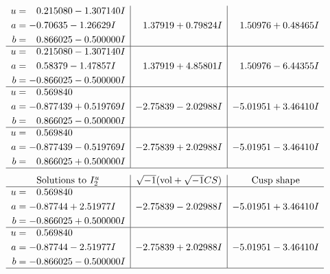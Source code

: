 \documentclass[1p]{elsarticle_modified}
\theoremstyle{definition}
\newcommand{\I}{\sqrt{-1}}
\begin{document}
$$\begin{array}{c|c|c}
\begin{aligned}
u &= \phantom{-}0.215080 - 1.307140 I \\
a &= -0.70635 - 1.26629 I \\
b &= \phantom{-}0.866025 - 0.500000 I\end{aligned}
 & \phantom{-}1.37919 + 0.79824 I & \phantom{-}1.50976 + 0.48465 I \\ \hline\begin{aligned}
u &= \phantom{-}0.215080 - 1.307140 I \\
a &= \phantom{-}0.58379 - 1.47857 I \\
b &= -0.866025 - 0.500000 I\end{aligned}
 & \phantom{-}1.37919 + 4.85801 I & \phantom{-}1.50976 - 6.44355 I \\ \hline\begin{aligned}
u &= \phantom{-}0.569840\phantom{ +0.000000I} \\
a &= -0.877439 + 0.519769 I \\
b &= \phantom{-}0.866025 - 0.500000 I\end{aligned}
 & -2.75839 - 2.02988 I & -5.01951 + 3.46410 I \\ \hline\begin{aligned}
u &= \phantom{-}0.569840\phantom{ +0.000000I} \\
a &= -0.877439 - 0.519769 I \\
b &= \phantom{-}0.866025 + 0.500000 I\end{aligned}
 & -2.75839 + 2.02988 I & -5.01951 - 3.46410 I\\
 \hline 
 \end{array}$$\newpage$$\begin{array}{c|c|c}  
\text{Solutions to }I^u_{2}& \I (\text{vol} + \sqrt{-1}CS) & \text{Cusp shape}\\
 \hline 
\begin{aligned}
u &= \phantom{-}0.569840\phantom{ +0.000000I} \\
a &= -0.87744 + 2.51977 I \\
b &= -0.866025 + 0.500000 I\end{aligned}
 & -2.75839 - 2.02988 I & -5.01951 + 3.46410 I \\ \hline\begin{aligned}
u &= \phantom{-}0.569840\phantom{ +0.000000I} \\
a &= -0.87744 - 2.51977 I \\
b &= -0.866025 - 0.500000 I\end{aligned}
 & -2.75839 + 2.02988 I & -5.01951 - 3.46410 I\\
 \hline 
 \end{array}$$\newpage
\end{document}
